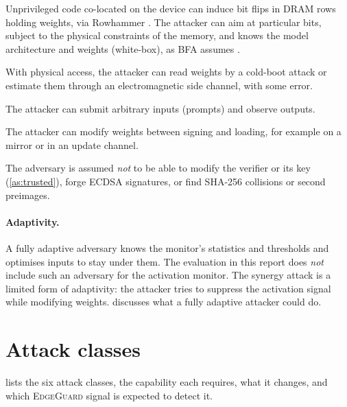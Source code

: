 \begin{description}[leftmargin=*,style=nextline]
  \item[C1 — DRAM write primitive.] Unprivileged code co-located on the device can induce bit
        flips in DRAM rows holding weights, via Rowhammer
        \cite{kim2014flipping,yao2020deephammer}. The attacker can aim at particular bits, subject
        to the physical constraints of the memory, and knows the model architecture and weights
        (white-box), as BFA assumes \cite{rakin2019bfa}.
  \item[C2 — DRAM read primitive.] With physical access, the attacker can read weights by a
        cold-boot attack \cite{halderman2008lest} or estimate them through an electromagnetic
        side channel, with some error.
  \item[C3 — Input control.] The attacker can submit arbitrary inputs (prompts) and observe
        outputs.
  \item[C4 — Supply-chain access.] The attacker can modify weights between signing and loading,
        for example on a mirror or in an update channel.
\end{description}

\noindent The adversary is assumed \emph{not} to be able to modify the verifier or its key
(\cref{as:trusted}), forge ECDSA signatures, or find SHA-256 collisions or second preimages.

\paragraph{Adaptivity.} A fully adaptive adversary knows the monitor's statistics and thresholds
and optimises inputs to stay under them. The evaluation in this report does \emph{not} include
such an adversary for the activation monitor. The synergy attack is a limited form of
adaptivity: the attacker tries to suppress the activation signal while modifying weights.
 discusses what a fully adaptive attacker could do.

\section{Attack classes}
\label{sec:tm:attacks}

 lists the six attack classes, the capability each requires, what it
changes, and which \textsc{EdgeGuard} signal is expected to detect it.

